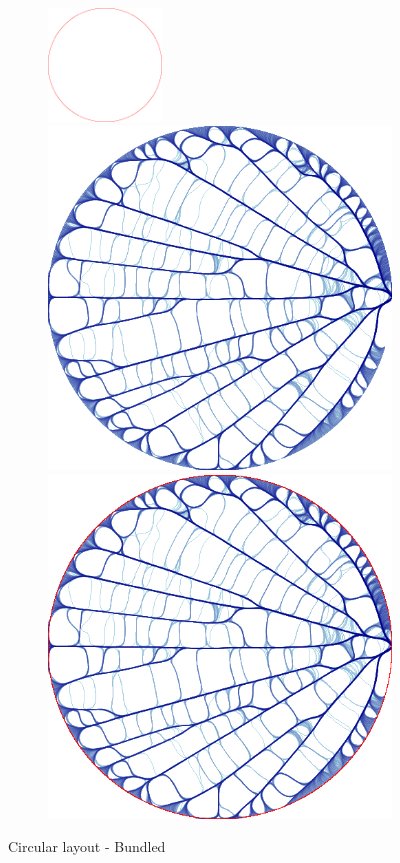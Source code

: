 \documentclass[12pt, a4paper]{article}
\begin{document}
\bgroup
  \inputminted[linenos, breaklines=true, fontsize=\scriptsize, firstnumber=last]{python}{src/youtube/datashader/simple/2c_saving.py}
  \label{listing:youtube_lgr_2c}
\egroup


\begin{figure}[H]
    \centering
    \begin{subfigure}[b]{\textwidth}
        \centering
        \includegraphics[width=0.33\textwidth]{src/youtube/datashader/simple/datashader/1_1}%
        \hfill
        \includegraphics[width=0.33\columnwidth]{src/youtube/datashader/simple/datashader/1_2}%
        \hfill
        \includegraphics[width=0.33\columnwidth]{src/youtube/datashader/simple/datashader/1_3}
    \end{subfigure}
    \caption{Circular layout - Bundled}
    \label{fig:ds_show_1}
\end{figure}
\end{document}
